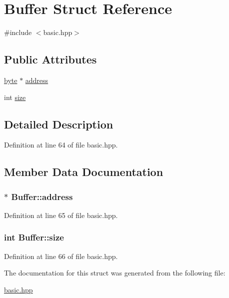 \hypertarget{struct_buffer}{
\section{Buffer Struct Reference}
\label{struct_buffer}
}


{\ttfamily \#include $<$basic.hpp$>$}\subsection*{Public Attributes}
\begin{DoxyCompactItemize}
\item 
\hyperlink{engine_8hpp_a0c8186d9b9b7880309c27230bbb5e69d}{byte} $\ast$ \hyperlink{struct_buffer_a06797e587eada327990612630ab3552b}{address}
\item 
int \hyperlink{struct_buffer_ab73cc798639521aed06c3159faa40449}{size}
\end{DoxyCompactItemize}


\subsection{Detailed Description}


Definition at line 64 of file basic.hpp.

\subsection{Member Data Documentation}
\hypertarget{struct_buffer_a06797e587eada327990612630ab3552b}{
\subsubsection[{address}]{$\ast$ {\bf Buffer::address}}}
\label{struct_buffer_a06797e587eada327990612630ab3552b}


Definition at line 65 of file basic.hpp.\hypertarget{struct_buffer_ab73cc798639521aed06c3159faa40449}{
\subsubsection[{size}]{\setlength{\rightskip}{0pt plus 5cm}int {\bf Buffer::size}}}
\label{struct_buffer_ab73cc798639521aed06c3159faa40449}


Definition at line 66 of file basic.hpp.

The documentation for this struct was generated from the following file:\begin{DoxyCompactItemize}
\item 
\hyperlink{basic_8hpp}{basic.hpp}\end{DoxyCompactItemize}
